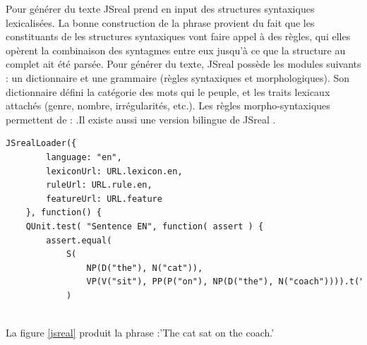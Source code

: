 Pour générer du texte JSreal prend en input des structures syntaxiques lexicalisées. La bonne construction de la phrase provient du fait que les constituants de les structures syntaxiques vont faire appel à des règles, qui elles opèrent la combinaison des syntagmes entre eux jusqu'à ce que la structure au complet ait été parsée. Pour générer du texte, JSreal possède les modules suivants : un dictionnaire et une grammaire (règles syntaxiques et morphologiques). Son dictionnaire défini la catégorie des mots qui le peuple, et les traits lexicaux attachés (genre, nombre, irrégularités, etc.). Les règles morpho-syntaxiques permettent de : .Il existe aussi une version bilingue de JSreal \citep{MolinsJSrealBBilingualText2015}.

\begin{lstlisting}[language=Xml, caption=JSreal, label=jsreal]
JSrealLoader({
        language: "en",
        lexiconUrl: URL.lexicon.en,
        ruleUrl: URL.rule.en,
        featureUrl: URL.feature
    }, function() {
    QUnit.test( "Sentence EN", function( assert ) {
        assert.equal(
            S(
                NP(D("the"), N("cat")),
                VP(V("sit"), PP(P("on"), NP(D("the"), N("coach")))).t("ps")
            )
        
\end{lstlisting}
La figure \ref{jsreal} produit la phrase :'The cat sat on the coach.'
		
